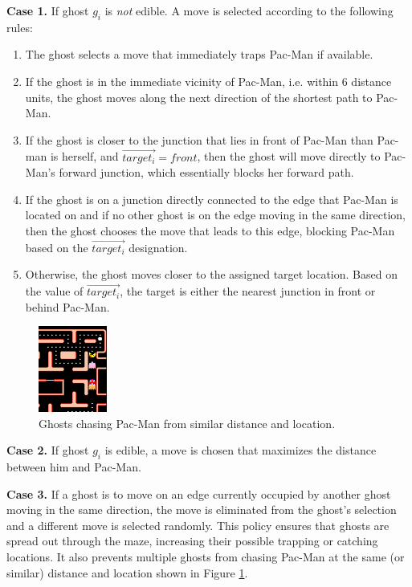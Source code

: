 \documentclass[journal]{IEEEtran}
\begin{document}
{\bf Case 1.} If ghost $g_i$ is \emph{not} edible. A move is selected according to the following rules:
\begin{enumerate}
\item The ghost selects a move that immediately traps Pac-Man if available.
\item If the ghost is in the immediate vicinity of Pac-Man, i.e. within $6$ distance units, the ghost moves along the next direction of the shortest path to Pac-Man.
\item If the ghost is closer to the junction that lies in front of Pac-Man than Pac-man is herself, and $\vec{target_i} = front$, then the ghost will move directly to Pac-Man's forward junction, which essentially blocks her forward path.
\item If the ghost is on a junction directly connected to the edge that Pac-Man is located on and if no other ghost is on the edge moving in the same direction, then the ghost chooses the move that leads to this edge, blocking Pac-Man based on the $ \vec{target_i}$ designation.
\item Otherwise, the ghost moves closer to the assigned target location. Based on the value of $\vec{target_i}$, the target is either the nearest junction in front or behind Pac-Man.
\end{enumerate}
\begin{figure}[t]
	\centering
	\includegraphics[width=0.2\textwidth]{figure5.png}
	\caption{Ghosts chasing Pac-Man from similar distance and location.}
	\label{fig:badchase}
\end{figure}

{\bf Case 2.} If ghost $g_i$ is edible, a move is chosen that maximizes the distance between him and Pac-Man.

{\bf Case 3.} If a ghost is to move on an edge currently occupied by another ghost moving in the same direction, the move is eliminated from the ghost's selection and a different move is selected randomly. This policy ensures that ghosts are spread out through the maze, increasing their possible trapping or catching locations. It also prevents multiple ghosts from chasing Pac-Man at the same (or similar) distance and location shown in Figure \ref{fig:badchase}.
\end{document}
